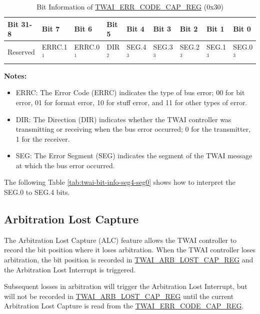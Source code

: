 \documentclass[main\_\_EN.tex]{subfiles}
\begin{document}
\begin{longtable}[c]{|p{1.4cm}|p{1.4cm}|p{1.4cm}|p{1.4cm}|p{1.4cm}|p{1.4cm}|p{1.4cm}|p{1.4cm}|p{1.4cm}|}
    \caption{Bit Information of \hyperref[regdesc:TWAIERRCODECAPREG]{TWAI\_ERR\_CODE\_CAP\_REG} (0x30)}
    \label{tab:twai-bit-info-error-code-cap-reg}\\
    \hline
    \rowcolor{lightgray}
    \textbf{Bit 31-8} & \textbf{Bit 7} & \textbf{Bit 6} & \textbf{Bit 5} & \textbf{Bit 4} & \textbf{Bit 3} & \textbf{Bit 2} & \textbf{Bit 1} & \textbf{Bit 0}\\\hline
    Reserved & ERRC.1$^1$ & ERRC.0$^1$ & DIR$^2$ & SEG.4$^3$ & SEG.3$^3$ & SEG.2$^3$ & SEG.1$^3$ & SEG.0$^3$\\
    \hline
\end{longtable}
\vspace{-1.5em}
{\bfseries Notes:}\\
\begin{itemize}
    \item ERRC: The Error Code (ERRC) indicates the type of bus error; 00 for bit error, 01 for format error, 10 for stuff error, and 11 for other types of error.
    \item DIR: The Direction (DIR) indicates whether the TWAI controller was transmitting or receiving when the bus error occurred; 0 for the transmitter, 1 for the receiver.
    \item SEG: The Error Segment (SEG) indicates the segment of the TWAI message at which the bus error occurred.
\end{itemize}

The following Table \ref{tab:twai-bit-info-seg4-seg0} shows how to interpret the SEG.0 to SEG.4 bits.



\subsection{Arbitration Lost Capture}

The Arbitration Lost Capture (ALC) feature allows the TWAI controller to record the bit position where it loses arbitration. When the TWAI controller loses arbitration, the bit position is recorded in \hyperref[regdesc:TWAIARBLOSTCAPREG]{TWAI\_ARB\_LOST\_CAP\_REG} and the Arbitration Lost Interrupt is triggered.

Subsequent losses in arbitration will trigger the Arbitration Lost Interrupt, but will not be recorded in \hyperref[regdesc:TWAIARBLOSTCAPREG]{TWAI\_ARB\_LOST\_CAP\_REG} until the current Arbitration Lost Capture is read from the \hyperref[regdesc:TWAIERRCODECAPREG]{TWAI\_ERR\_CODE\_CAP\_REG}.
\end{document}
